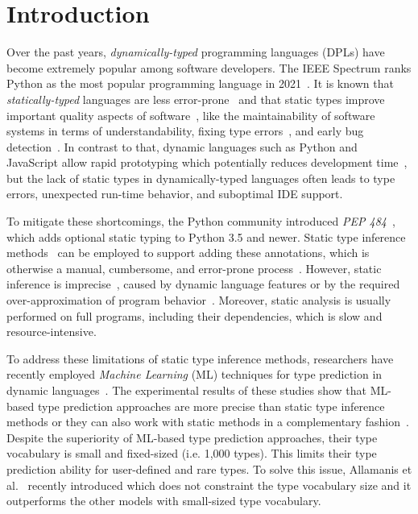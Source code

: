 \section{Introduction}
Over the past years, \emph{dynamically-typed} programming languages (DPLs) have become extremely popular among software developers.
The IEEE Spectrum ranks Python as the most popular programming language in 2021~\cite{ieeespec2019}.
It is known that \emph{statically-typed} languages are less error-prone~\cite{ray2014large} and that static types improve important quality aspects of software~\cite{gao2017type}, like the maintainability of software systems in terms of understandability, fixing type errors~\cite{hanenberg2014empirical}, and early bug detection~\cite{gao2017type}.
In contrast to that, dynamic languages such as Python and JavaScript allow rapid prototyping which potentially reduces development time~\cite{hanenberg2014empirical, stuchlik2011static}, but the lack of static types in dynamically-typed languages often leads to type errors, unexpected run-time behavior, and suboptimal IDE support.

To mitigate these shortcomings, the Python community introduced \emph{PEP 484}~\cite{van2014pep}, which adds optional static typing to Python 3.5 and newer.
Static type inference methods~\cite{hassan2018maxsmt, furr2009static} can be employed to support adding these annotations, which is otherwise a manual, cumbersome, and error-prone process~\cite{ore2018assessing}.
However, static inference is imprecise~\cite{pavlinovic2019leveraging}, caused by dynamic language features or by the required over-approximation of program behavior~\cite{madsen2015static}.
Moreover, static analysis is usually performed on full programs, including their dependencies, which is slow and resource-intensive.

To address these limitations of static type inference methods, researchers have recently employed \emph{Machine Learning} (ML) techniques for type prediction in dynamic languages~\cite{hellendoorn2018deep, malik2019nl2type, pradel2019typewriter, allamanis2020typilus}.
The experimental results of these studies show that ML-based type prediction approaches are more precise than static type inference methods or they can also work with static methods in a complementary fashion~\cite{pradel2019typewriter, allamanis2020typilus}. Despite the superiority of ML-based type prediction approaches, their type vocabulary is small and fixed-sized (i.e. 1,000 types). This limits their type prediction ability for user-defined and rare types. To solve this issue, Allamanis et al.~\cite{allamanis2020typilus} recently introduced  which does not constraint the type vocabulary size and it outperforms the other models with small-sized type vocabulary.

